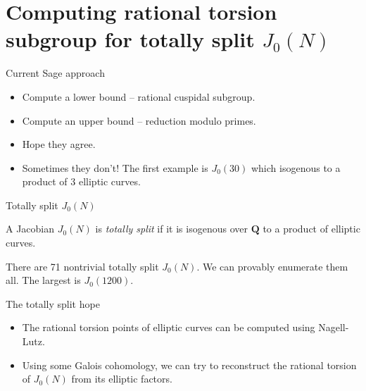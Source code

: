 \documentclass{beamer}
\newcommand{\QQ}{\mathbf{Q}}
\begin{document}
\section{Computing rational torsion subgroup for totally split $J_0(N)$}

\begin{frame}{Current Sage approach}
    \begin{itemize}
        \item
            Compute a lower bound -- rational cuspidal subgroup.
        \item
            Compute an upper bound -- reduction modulo primes.
        \item
            Hope they agree. 
        \item
            Sometimes they don't! The first example is $J_0(30)$ which
            isogenous to a product of 3 elliptic curves.
    \end{itemize}
\end{frame}

\begin{frame}{Totally split $J_0(N)$}
    \begin{definition}
        A Jacobian $J_0(N)$ is \emph{totally split} if it is isogenous over
        $\QQ$ to a product of elliptic curves.
    \end{definition}

    \begin{theorem}[K.L.]
        There are 71 nontrivial totally split $J_0(N)$. We can provably
        enumerate them all. The largest is $J_0(1200)$.
    \end{theorem}
\end{frame}

\begin{frame}{The totally split hope}
    \begin{itemize}
        \item 
            The rational torsion points of elliptic curves can be computed
            using Nagell-Lutz.
        \item
            Using some Galois cohomology, we can try to reconstruct the
            rational torsion of $J_0(N)$ from its elliptic factors.
    \end{itemize}
\end{frame}
\end{document}
